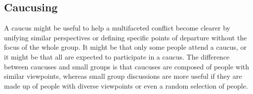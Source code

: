 \subsection{Caucusing}

A caucus might be useful to help a multifaceted conflict become
clearer by unifying similar perspectives or defining specific
points of departure without the focus of the whole group. It might
be that only some people attend a caucus, or it might be that all
are expected to participate in a caucus. The difference between
caucuses and small groups is that caucuses are composed of people
with similar viewpoints, whereas small group discussions are more
useful if they are made up of people with diverse viewpoints
or even a random selection of people.
